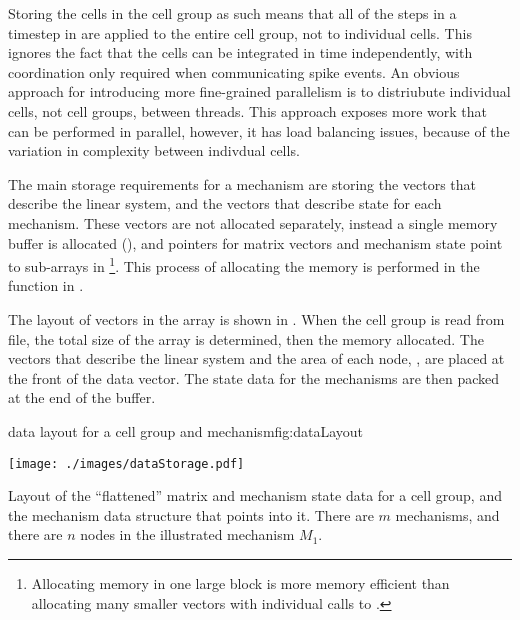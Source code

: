 \begin{note}
Storing the cells in the cell group as such means that all of the steps in a timestep in  are applied to the entire cell group, not to individual cells.
This ignores the fact that the cells can be integrated in time independently, with coordination only required when communicating spike events.
An obvious approach for introducing more fine-grained parallelism is to distriubute individual cells, not cell groups, between threads.
This approach exposes more work that can be performed in parallel, however, it has load balancing issues, because of the variation in complexity between indivdual cells.
\end{note}

The main storage requirements for a mechanism are storing the vectors that describe the linear system, and the vectors that describe state for each mechanism.
These vectors are not allocated separately, instead a single memory buffer is allocated (), and pointers for matrix vectors and mechanism state point to sub-arrays in 
\footnote{
Allocating memory in one large block is more memory efficient than allocating many smaller vectors with individual calls to .
}.
This process of allocating the memory is performed in the function  in .

The layout of vectors in the  array is shown in .
When the cell group is read from file, the total size of the  array is determined, then the memory allocated.
The vectors that describe the linear system and the area of each node, , are placed at the front of the data vector.
The state data for the mechanisms are then packed at the end of the buffer.

\begin{myfigure}{data layout for a cell group and mechanism}{fig:dataLayout}
\begin{center}
\texttt{[image: ./images/dataStorage.pdf]}
\end{center}
Layout of the ``flattened'' matrix and mechanism state data for a cell group, and the mechanism data structure that points into it. There are $m$ mechanisms, and there are $n$ nodes in the illustrated mechanism $M_1$.
\end{myfigure}


